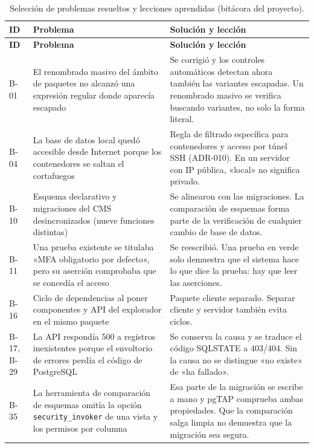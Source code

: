 \begin{longtable}{@{}l>{\raggedright\arraybackslash}p{4.8cm}>{\raggedright\arraybackslash}p{7.4cm}@{}}
  \caption{Selección de problemas resueltos y lecciones aprendidas (bitácora del proyecto).}\label{tab:imp-bitacora}\\
  \toprule
  \textbf{ID} & \textbf{Problema} & \textbf{Solución y lección} \\
  \midrule
  \endfirsthead
  \toprule
  \textbf{ID} & \textbf{Problema} & \textbf{Solución y lección} \\
  \midrule
  \endhead
  \bottomrule
  \endfoot
  B-01 & El renombrado masivo del ámbito de paquetes no alcanzó una expresión regular donde aparecía escapado & Se corrigió y los controles automáticos detectan ahora también las variantes escapadas. Un renombrado masivo se verifica buscando variantes, no solo la forma literal. \\
  B-04 & La base de datos local quedó accesible desde Internet porque los contenedores se saltan el cortafuegos & Regla de filtrado específica para contenedores y acceso por túnel SSH (ADR-010). En un servidor con IP pública, «local» no significa privado. \\
  B-10 & Esquema declarativo y migraciones del CMS desincronizados (nueve funciones distintas) & Se alinearon con las migraciones. La comparación de esquemas forma parte de la verificación de cualquier cambio de base de datos. \\
  B-11 & Una prueba existente se titulaba «MFA obligatorio por defecto», pero su aserción comprobaba que se concedía el acceso & Se reescribió. Una prueba en verde solo demuestra que el sistema hace lo que dice la prueba: hay que leer las aserciones. \\
  B-16 & Ciclo de dependencias al poner componentes y API del explorador en el mismo paquete & Paquete cliente separado. Separar cliente y servidor también evita ciclos. \\
  B-17, B-29 & La API respondía 500 a registros inexistentes porque el envoltorio de errores perdía el código de PostgreSQL & Se conserva la causa y se traduce el código SQLSTATE a 403/404. Sin la causa no se distingue «no existe» de «ha fallado». \\
  B-35 & La herramienta de comparación de esquemas omitía la opción \texttt{security\_invoker} de una vista y los permisos por columna & Esa parte de la migración se escribe a mano y pgTAP comprueba ambas propiedades. Que la comparación salga limpia no demuestra que la migración sea segura. \\

\end{longtable}
